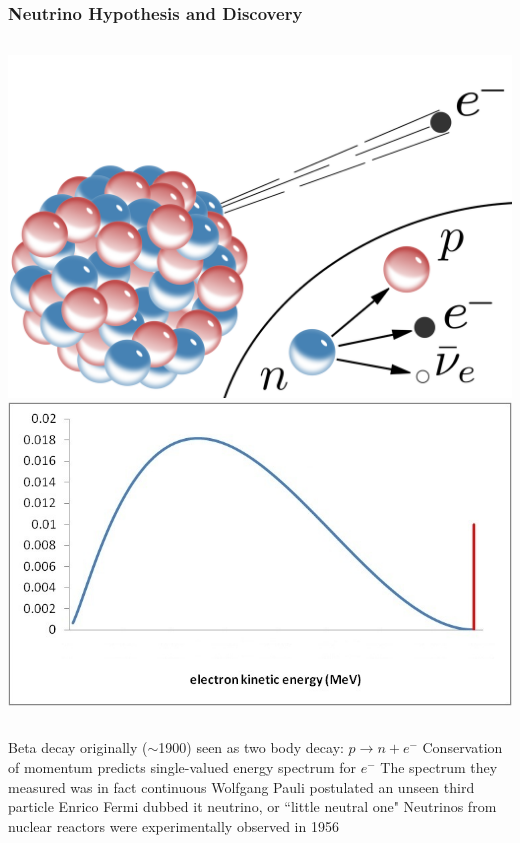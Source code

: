 \documentclass[10pt,professionalfonts,xcolor=table]{beamer}
\begin{document}
\frame
{
  \frametitle{Neutrino Hypothesis and Discovery}

  \begin{columns}[c]
  \centering
  \includegraphics[height=0.37\textheight]{figures/figures/betaPretty.png}
  \centering
  \includegraphics[height=0.37\textheight]{figures/figures/betaspec.jpg}
  \end{columns}
  \gap
  \begin{itemize}
  \bang Beta decay originally ($\sim$1900) seen as two body decay: $p \rightarrow n + e^-$
  \bang Conservation of momentum predicts single-valued energy spectrum for $e^-$
  \bang The spectrum they measured was in fact continuous
  \vspace{10pt}
  \bang Wolfgang Pauli postulated an unseen third particle
  \bang Enrico Fermi dubbed it neutrino, or ``little neutral one"
  \bang Neutrinos from nuclear reactors were experimentally observed in 1956
  \end{itemize}
}
\end{document}

